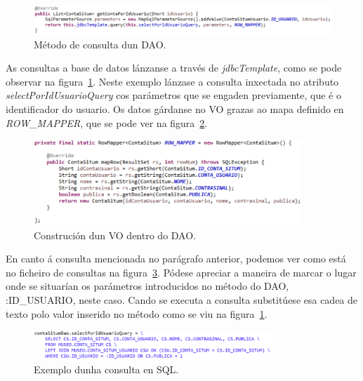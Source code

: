 \begin{figure}[tbh] 
	\begin{center}
		\includegraphics[width=1\textwidth]{figures/codigo/daoConsulta}
		\caption{Método de consulta dun DAO.}
		\label{fig:daoConsulta}
	\end{center}
\end{figure}

As consultas a base de datos lánzanse a través de \emph{jdbcTemplate}, como se pode observar na figura~\ref{fig:daoConsulta}. Neste exemplo lánzase a consulta inxectada no atributo \emph{selectPorIdUsuarioQuery} cos parámetros que se engaden previamente, que é o identificador do usuario. Os datos gárdanse no VO grazas ao mapa definido en \emph{ROW\_MAPPER}, que se pode ver na figura~\ref{fig:daoRowMapper}.

\begin{figure}[tbh] 
	\begin{center}
		\includegraphics[width=0.9\textwidth]{figures/codigo/daoRowMapper}
		\caption{Construción dun VO dentro do DAO.}
		\label{fig:daoRowMapper}
	\end{center}
\end{figure}

En canto á consulta mencionada no parágrafo anterior, podemos ver como está no ficheiro de consultas na figura~\ref{fig:daoConsultaSQL}. Pódese apreciar a maneira de marcar o lugar onde se situarían os parámetros introducidos no método do DAO, :ID\_USUARIO, neste caso. Cando se executa a consulta substitúese esa cadea de texto polo valor inserido no método como se viu na figura~\ref{fig:daoConsulta}.

\begin{figure}[tbh] 
	\begin{center}
		\includegraphics[width=0.8\textwidth]{figures/codigo/daoConsultaSQL}
		\caption{Exemplo dunha consulta en SQL.}
		\label{fig:daoConsultaSQL}
	\end{center}
\end{figure}

